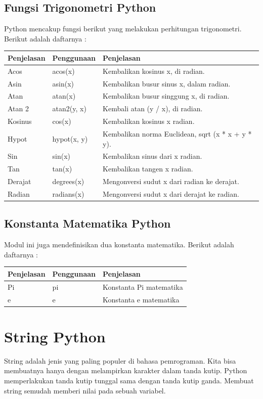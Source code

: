 \subsection{Fungsi Trigonometri Python}
Python mencakup fungsi berikut yang melakukan perhitungan trigonometri. Berikut adalah daftarnya :
\begin{center}
\begin{tabular}{ | m{2cm} | m{2cm} | m{5cm} | }
\hline
Penjelasan & Penggunaan & Penjelasan \\
\hline
Acos & acos(x) & Kembalikan kosinus x, di radian.\\
\hline
Asin & asin(x) & Kembalikan busur sinus x, dalam radian.\\
\hline
Atan & atan(x) & Kembalikan busur singgung x, di radian.\\
\hline
Atan 2 & atan2(y, x) & Kembali atan (y / x), di radian.\\
\hline
Kosinus & cos(x) & Kembalikan kosinus x radian.\\
\hline
Hypot & hypot(x, y) & Kembalikan norma Euclidean, sqrt (x * x + y * y).\\
\hline
Sin & sin(x) & Kembalikan sinus dari x radian.\\
\hline
Tan & tan(x) & Kembalikan tangen x radian.\\
\hline
Derajat & degrees(x) & Mengonversi sudut x dari radian ke derajat.\\
\hline
Radian & radians(x) & Mengonversi sudut x dari derajat ke radian.\\
\hline
\end{tabular}
\end{center}

\subsection{Konstanta Matematika Python}
Modul ini juga mendefinisikan dua konstanta matematika. Berikut adalah daftarnya :
\begin{center}
\begin{tabular}{ | m{2cm} | m{2cm} | m{5cm} | }
\hline
Penjelasan & Penggunaan & Penjelasan \\
\hline
Pi & pi & Konstanta Pi matematika\\
\hline
e & e & Konstanta e matematika\\
\hline
\end{tabular}
\end{center}

\section{String Python}
String adalah jenis yang paling populer di bahasa pemrograman. Kita bisa membuatnya hanya dengan melampirkan karakter dalam tanda kutip. Python memperlakukan tanda kutip tunggal sama dengan tanda kutip ganda. Membuat string semudah memberi nilai pada sebuah variabel.

